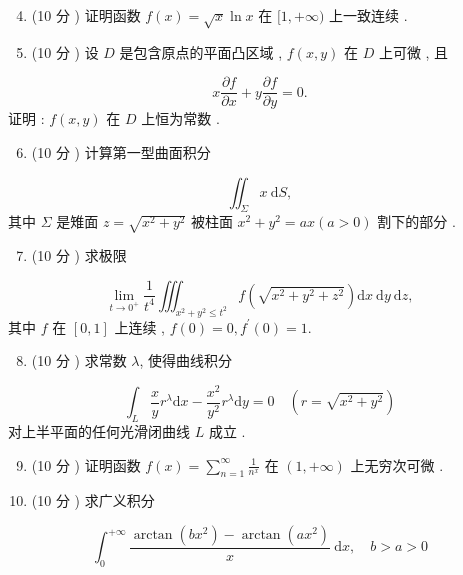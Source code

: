 \documentclass[10pt]{article}
\begin{document}
\begin{enumerate}
  \setcounter{enumi}{3}
  \item (10  分 )  证明函数  $f(x)=\sqrt{x} \ln x$  在  $[1,+\infty)$  上一致连续 .

  \item (10  分 )  设  $D$  是包含原点的平面凸区域 , $f(x, y)$  在  $D$  上可微 ,  且 

\end{enumerate}
$$
x \frac{\partial f}{\partial x}+y \frac{\partial f}{\partial y}=0 .
$$
 证明 : $f(x, y)$  在  $D$  上恒为常数 .

\begin{enumerate}
  \setcounter{enumi}{5}
  \item (10  分 )  计算第一型曲面积分 
\end{enumerate}
$$
\iint_{\Sigma} x \mathrm{~d} S,
$$
 其中  $\Sigma$  是雉面  $z=\sqrt{x^{2}+y^{2}}$  被柱面  $x^{2}+y^{2}=a x(a>0)$  割下的部分 .

\begin{enumerate}
  \setcounter{enumi}{6}
  \item (10  分 )  求极限 
\end{enumerate}
$$
\lim _{t \rightarrow 0^{+}} \frac{1}{t^{4}} \iiint_{x^{2}+y^{2} \leqslant t^{2}} f\left(\sqrt{x^{2}+y^{2}+z^{2}}\right) \mathrm{d} x \mathrm{~d} y \mathrm{~d} z,
$$
 其中  $f$  在  $[0,1]$  上连续 , $f(0)=0, f^{\prime}(0)=1$.

\begin{enumerate}
  \setcounter{enumi}{7}
  \item (10  分 )  求常数  $\lambda$,  使得曲线积分 
\end{enumerate}
$$
\int_{L} \frac{x}{y} r^{\lambda} \mathrm{d} x-\frac{x^{2}}{y^{2}} r^{\lambda} \mathrm{d} y=0 \quad\left(r=\sqrt{x^{2}+y^{2}}\right)
$$
 对上半平面的任何光滑闭曲线  $L$  成立 .

\begin{enumerate}
  \setcounter{enumi}{8}
  \item (10  分 )  证明函数  $f(x)=\sum_{n=1}^{\infty} \frac{1}{n^{x}}$  在  $(1,+\infty)$  上无穷次可微 .

  \item (10  分 )  求广义积分 

\end{enumerate}
$$
\int_{0}^{+\infty} \frac{\arctan \left(b x^{2}\right)-\arctan \left(a x^{2}\right)}{x} \mathrm{~d} x, \quad b>a>0
$$
\end{document}
